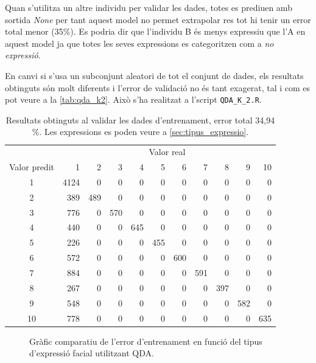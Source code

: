 \documentclass[a4paper]{article}
\begin{document}
Quan s'utilitza un altre individu per validar les dades, totes es prediuen amb sortida \emph{None} per tant aquest model no permet extrapolar res tot hi tenir un error total menor (35\%). Es podria dir que l'individu B és menys expressiu que l'A en aquest model ja que totes les seves expressions es categoritzen com a \emph{no expressió}.

En canvi si s'usa un subconjunt aleatori de tot el conjunt de dades, els resultats obtinguts són molt diferents i l'error de validació no és tant exagerat, tal i com es pot veure a la \autoref{tab:qda_k2}. Això s'ha realitzat a l'script \verb|QDA_K_2.R|.

\begin{table}[H]
	\centering
	\def\arraystretch{1.2}
	\begin{tabular}{|c|rrrrrrrrrr|}
		\hline
		& \multicolumn{10}{c|}{Valor real} \\
		Valor predit & 1 & 2 & 3 & 4 & 5 & 6 & 7 & 8 & 9 & 10 \\
		\hline
		1 & 4124 & 0 & 0 & 0 & 0 & 0 & 0 & 0 & 0 & 0 \\
		2 & 389 & 489 & 0 & 0 & 0 & 0 & 0 & 0 & 0 & 0 \\
		3 & 776 & 0 & 570 & 0 & 0 & 0 & 0 & 0 & 0 & 0 \\
		4 & 440 & 0 & 0 & 645 & 0 & 0 & 0 & 0 & 0 & 0 \\
		5 & 226 & 0 & 0 & 0 & 455 & 0 & 0 & 0 & 0 & 0 \\
		6 & 572 & 0 & 0 & 0 & 0 & 600 & 0 & 0 & 0 & 0 \\
		7 & 884 & 0 & 0 & 0 & 0 & 0 & 591 & 0 & 0 & 0 \\
		8 & 267 & 0 & 0 & 0 & 0 & 0 & 0 & 397 & 0 & 0 \\
		9 & 548 & 0 & 0 & 0 & 0 & 0 & 0 & 0 & 582 & 0 \\
		10 & 778 & 0 & 0 & 0 & 0 & 0 & 0 & 0 & 0 & 635 \\
		\hline
	\end{tabular}
	\captionsetup{width=0.8\textwidth}
	\caption{Resultats obtinguts al validar les dades d'entrenament, error total 34,94 \%. Les expressions es poden veure a \autoref{sec:tipus_expressio}.}
\end{table}

\begin{figure}[H]
	\centering
	\captionsetup{width=0.8\textwidth}
	\caption{Gràfic comparatiu de l'error d'entrenament en funció del tipus d'expressió facial utilitzant QDA.}
\end{figure}
\end{document}
